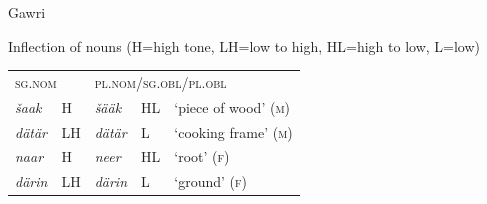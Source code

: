 \documentclass[output=collectionpaper]{langsci/langscibook}
\begin{document}
\ea
\label{ex:Lilje:9}
Gawri\\
\begin{xlist}
\ex
Inflection of nouns (H=high tone, LH=low to high, HL=high to low, L=low) \citep[36]{Baart1999}\\
\medskip
\begin{tabular}{lllll}
\multicolumn{2}{l}{\textsc{sg.nom}}  & 	\multicolumn{3}{l}{\textsc{pl.nom/sg.obl/pl.obl}} \\
\itshape šaak  & H  &  \itshape šääk &  HL &  `piece of wood' (\textsc{m}) \\
\itshape dätär &  LH &\itshape    dätär &  L &  `cooking frame' (\textsc{m}) \\
\itshape naar &  H &   \itshape neer &  HL &  `root' (\textsc{f}) \\
\itshape därin &  LH &   \itshape därin &  L &  `ground' (\textsc{f}) \\
\end{tabular}


\end{xlist}
\end{document}
